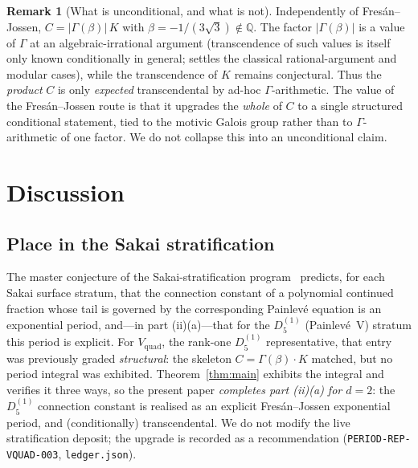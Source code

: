\documentclass[11pt,reqno]{amsart}
\theoremstyle{plain}
\theoremstyle{definition}
\newtheorem{remark}[theorem]{Remark}
\newcommand{\Vquad}{V_{\mathrm{quad}}}
\providecommand{\C}{}\renewcommand{\C}{C}
\begin{document}
\begin{remark}[What is unconditional, and what is not]\label{rmk:uncond}
Independently of Fres\'an--Jossen, $\C=\lvert\Gamma(\beta)\rvert\,K$ with
$\beta=-1/(3\sqrt3)\notin\mathbb{Q}$. The factor $\lvert\Gamma(\beta)\rvert$ is a value of
$\Gamma$ at an algebraic-irrational argument (transcendence of such values is itself only known
conditionally in general; \cite{Nesterenko} settles the classical rational-argument and modular
cases), while the transcendence of $K$ remains conjectural. Thus the \emph{product} $\C$ is only
\emph{expected} transcendental by ad-hoc $\Gamma$-arithmetic. The value of the Fres\'an--Jossen
route is that it upgrades the \emph{whole} of $\C$ to a single structured conditional statement,
tied to the motivic Galois group rather than to $\Gamma$-arithmetic of one factor. We do not
collapse this into an unconditional claim.
\end{remark}

\section{Discussion}\label{sec:disc}

\subsection{Place in the Sakai stratification}
The master conjecture of the Sakai-stratification program~\cite{Sakai} predicts, for each Sakai
surface stratum, that the connection constant of a polynomial continued fraction whose tail is
governed by the corresponding Painlev\'e equation is an exponential period, and---in part
(ii)(a)---that for the $D_5^{(1)}$ (Painlev\'e~V) stratum this period is explicit. For $\Vquad$,
the rank-one $D_5^{(1)}$ representative, that entry was previously graded \emph{structural}: the
skeleton $\C=\Gamma(\beta)\cdot K$ matched, but no period integral was exhibited.
Theorem~\ref{thm:main} exhibits the integral and verifies it three ways, so the present paper
\emph{completes part (ii)(a) for $d=2$}: the $D_5^{(1)}$ connection constant is realised as an
explicit Fres\'an--Jossen exponential period, and (conditionally) transcendental. We do not modify
the live stratification deposit; the upgrade is recorded as a recommendation
(\texttt{PERIOD-REP-VQUAD-003}, \texttt{ledger.json}).
\end{document}
